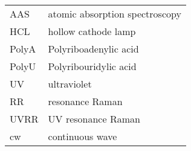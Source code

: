 

\noindent
\begin{tabularx}{\textwidth}{@{}l@{\,\dotfill\dots\,}X@{}}
AAS
	& atomic absorption spectroscopy\\
HCL
	& hollow cathode lamp\\
PolyA
	& Polyriboadenylic acid\\
PolyU
	& Polyribouridylic acid\\
UV
	& ultraviolet\\
RR
	& resonance Raman\\
UVRR
	& UV resonance Raman\\
cw
	& continuous wave
\end{tabularx}

